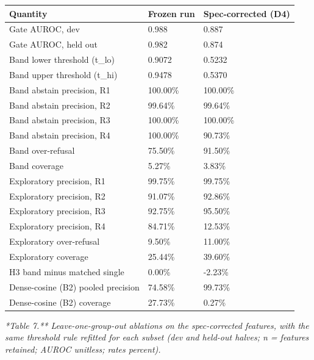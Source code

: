 \begin{table}[t]
\centering
\scriptsize
  \begin{tabularx}{\textwidth}{lXX}
    \toprule
    Quantity & Frozen run & Spec-corrected (D4) \\
\midrule
    Gate AUROC, dev & 0.988 & 0.887 \\
    Gate AUROC, held out & 0.982 & 0.874 \\
    Band lower threshold (t\_lo) & 0.9072 & 0.5232 \\
    Band upper threshold (t\_hi) & 0.9478 & 0.5370 \\
    Band abstain precision, R1 & 100.00\% & 100.00\% \\
    Band abstain precision, R2 & 99.64\% & 99.64\% \\
    Band abstain precision, R3 & 100.00\% & 100.00\% \\
    Band abstain precision, R4 & 100.00\% & 90.73\% \\
    Band over-refusal & 75.50\% & 91.50\% \\
    Band coverage & 5.27\% & 3.83\% \\
    Exploratory precision, R1 & 99.75\% & 99.75\% \\
    Exploratory precision, R2 & 91.07\% & 92.86\% \\
    Exploratory precision, R3 & 92.75\% & 95.50\% \\
    Exploratory precision, R4 & 84.71\% & 12.53\% \\
    Exploratory over-refusal & 9.50\% & 11.00\% \\
    Exploratory coverage & 25.44\% & 39.60\% \\
    H3 band minus matched single & 0.00\% & -2.23\% \\
    Dense-cosine (B2) pooled precision & 74.58\% & 99.73\% \\
    Dense-cosine (B2) coverage & 27.73\% & 0.27\% \\
    \bottomrule
  \end{tabularx}
\end{table}
\textit{*Table 7.** Leave-one-group-out ablations on the spec-corrected features, with the same threshold rule refitted for each subset (dev and held-out halves; n = features retained; AUROC unitless; rates percent).}

